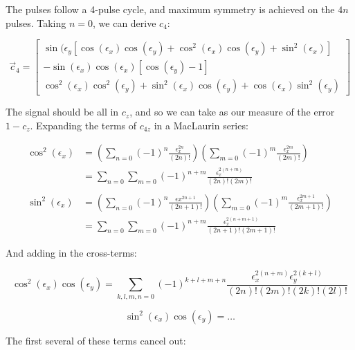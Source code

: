 \documentclass[../PaulGanssle-Thesis.tex]{subfiles}
\begin{document}
The pulses follow a 4-pulse cycle, and maximum symmetry is achieved on the $4n$ pulses. Taking $n=0$, we can derive $c_{4}$:

\[
\vec{c}_{4} = 
\begin{bmatrix}
\sin(\epsilon_{y}\left[\cos(\epsilon_{x})\cos(\epsilon_{y})+\cos^2(\epsilon_{x})\cos(\epsilon_{y})+\sin^2(\epsilon_{x})\right]\\
-\sin(\epsilon_{x})\cos(\epsilon_{x})\left[\cos(\epsilon_{y})-1\right] \\
\cos^2(\epsilon_{x})\cos^2(\epsilon_{y}) + \sin^2(\epsilon_{x})\cos(\epsilon_{y}) + \cos(\epsilon_{x})\sin^2(\epsilon_{y})
\end{bmatrix}
\]

The signal should be all in $c_z$, and so we can take as our measure of the error $1-c_{z}$. Expanding the terms of $c_{4z}$ in a MacLaurin series:

\begin{align*}
\cos^2(\epsilon_{x}) & =  \left(\sum_{n=0}(-1)^{n}\frac{\epsilon_{x}^{2n}}{(2n)!}\right)\left(\sum_{m=0}(-1)^{m}\frac{\epsilon_{x}^{2m}}{(2m)!}\right) \\
 & =  \sum_{n=0}\sum_{m=0}(-1)^{n+m}\frac{\epsilon_{x}^{2(n+m)}}{(2n)!(2m)!} \\
 &  \\
\sin^2(\epsilon_{x}) & = \left(\sum_{n=0}(-1)^{n}\frac{\epsilon{x}^{2n+1}}{(2n+1)!}\right)\left(\sum_{m=0}(-1)^{m}\frac{\epsilon_{x}^{2m+1}}{(2m+1)!}\right) \\
 & =  \sum_{n=0}\sum_{m=0}(-1)^{n+m}\frac{\epsilon_{x}^{2(n+m+1)}}{(2n+1)!(2m+1)!}
\end{align*}

And adding in the cross-terms:

\begin{equation}
\cos^2(\epsilon_{x})\cos(\epsilon_{y}) = \sum_{k,l,m,n=0}(-1)^{k+l+m+n}\frac{\epsilon_{x}^{2(n+m)}\epsilon_{y}^{2(k+l)}}{(2n)!(2m)!(2k)!(2l)!}
\end{equation}

\begin{equation}
\sin^2(\epsilon_{x})\cos(\epsilon_{y}) = \dots 
\end{equation}

The first several of these terms cancel out:
\end{document}
